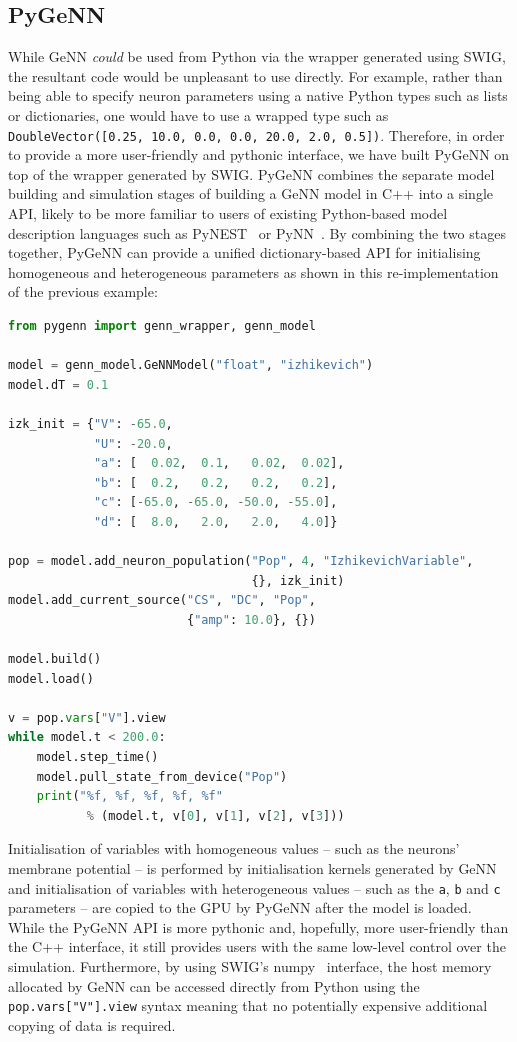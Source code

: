 \documentclass[utf8]{frontiersSCNS} %
\begin{document}
\subsection{PyGeNN}
\label{sec:methods/pygenn}
While GeNN \emph{could} be used from Python via the wrapper generated using SWIG, the resultant code would be unpleasant to use directly.
For example, rather than being able to specify neuron parameters using a native Python types such as lists or dictionaries, one would have to use a wrapped type such as \lstinline{DoubleVector([0.25, 10.0, 0.0, 0.0, 20.0, 2.0, 0.5])}.
Therefore, in order to provide a more user-friendly and pythonic interface, we have built PyGeNN on top of the wrapper generated by SWIG.
PyGeNN combines the separate model building and simulation stages of building a GeNN model in C++ into a single API, likely to be more familiar to users of existing Python-based model description languages such as PyNEST~\citep{Eppler2009} or PyNN~\citep{Davison2008}.
By combining the two stages together, PyGeNN can provide a unified dictionary-based API for initialising homogeneous and heterogeneous parameters as shown in this re-implementation of the previous example:
%
\begin{lstlisting}[language=Python]
from pygenn import genn_wrapper, genn_model

model = genn_model.GeNNModel("float", "izhikevich")
model.dT = 0.1

izk_init = {"V": -65.0,
            "U": -20.0,
            "a": [  0.02,  0.1,   0.02,  0.02],
            "b": [  0.2,   0.2,   0.2,   0.2],
            "c": [-65.0, -65.0, -50.0, -55.0],
            "d": [  8.0,   2.0,   2.0,   4.0]}

pop = model.add_neuron_population("Pop", 4, "IzhikevichVariable", 
                                  {}, izk_init)
model.add_current_source("CS", "DC", "Pop", 
                         {"amp": 10.0}, {})

model.build()
model.load()

v = pop.vars["V"].view
while model.t < 200.0:
    model.step_time()
    model.pull_state_from_device("Pop")
    print("%f, %f, %f, %f, %f" 
           % (model.t, v[0], v[1], v[2], v[3]))
\end{lstlisting}
%
Initialisation of variables with homogeneous values -- such as the neurons' membrane potential -- is performed by initialisation kernels generated by GeNN and initialisation of variables with heterogeneous values -- such as the \lstinline{a}, \lstinline{b} and \lstinline{c} parameters -- are copied to the GPU by PyGeNN after the model is loaded.
While the PyGeNN API is more pythonic and, hopefully, more user-friendly than the C++ interface, it still provides users with the same low-level control over the simulation.
Furthermore, by using SWIG's numpy~\citep{VanDerWalt2011} interface, the host memory allocated by GeNN can be accessed directly from Python using the \lstinline{pop.vars["V"].view} syntax meaning that no potentially expensive additional copying of data is required.
\end{document}
